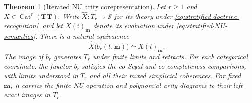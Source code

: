 \documentclass[oneside]{article}
\theoremstyle{plain}
\newtheorem{theorem}{Theorem}[section]
\theoremstyle{definition}
\theoremstyle{remark}
\newcommand{\Sps}{\mathcal S}
\newcommand{\TT}{\mathbf{TT}}
\begin{document}
\begin{theorem}[Iterated NU arity corepresentation]
\label{thm:stratified-native-arities}
Let $r\geq1$ and $X\in\operatorname{Cat}^r(\TT)$.
Write $\widehat X:T_r\to\Sps$ for its theory under
\eqref{eq:stratified-doctrine-recognition}, and let
$X(t)_{\mathbf m}$ denote its evaluation under
\eqref{eq:stratified-NU-semantics}.  There is a natural equivalence
\begin{equation}\label{eq:stratified-native-evaluation}
 \widehat X\bigl(b_r(t,\mathbf m)\bigr)
 \simeq X(t)_{\mathbf m}.
\end{equation}
The image of $b_r$ generates $T_r$ under finite limits and retracts.
For each categorical coordinate, the functor $b_r$ satisfies the
co-Segal and co-completeness comparisons, with limits understood in
$T_r$ and all their mixed simplicial coherences.  For fixed $\mathbf m$,
it carries the finite NU operation and polynomial-arity diagrams to
their left-exact images in $T_r$.
\end{theorem}
\end{document}
